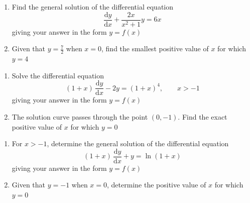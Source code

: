 \documentclass[leqno]{article}
\begin{document}
\djsFrontMatter
\begin{enumerate}[
  label=\textbf{\arabic*.},
  leftmargin=*,
  topsep=0pt,
  partopsep=0pt,
  parsep=0pt
]

\questionitem

\begin{enumerate}[label=\textbf{(\alph*)}]
  \item Find the general solution of the differential equation\\
  \[
  \frac{\mathrm{d}y}{\mathrm{d}x}+\frac{2x}{x^2+1}y=6x
  \]
  giving your answer in the form $y=f(x)$  \\
  \item Given that $y=\tfrac{7}{2}$ when $x=0$, find the smallest positive value of $x$ for which $y=4$  \\
\end{enumerate}

\newpage

\questionitem

\begin{enumerate}[label=\textbf{(\alph*)}]
  \item Solve the differential equation
  \[
  (1+x)\,\frac{\mathrm{d}y}{\mathrm{d}x}-2y=(1+x)^4,\qquad x>-1
  \]
  giving your answer in the form $y=f(x)$  \\
  \item The solution curve passes through the point $(0,-1)$. Find the exact positive value of $x$ for which $y=0$  \\
\end{enumerate}

\newpage

\questionitem

\begin{enumerate}[label=\textbf{(\alph*)}]
  \item For $x>-1$, determine the general solution of the differential equation
  \[
  (1+x)\,\frac{\mathrm{d}y}{\mathrm{d}x}+y=\ln(1+x)
  \]
  giving your answer in the form $y=f(x)$  \\
  \item Given that $y=-1$ when $x=0$, determine the positive value of $x$ for which $y=0$  \\
\end{enumerate}


\end{enumerate}
\end{document}
